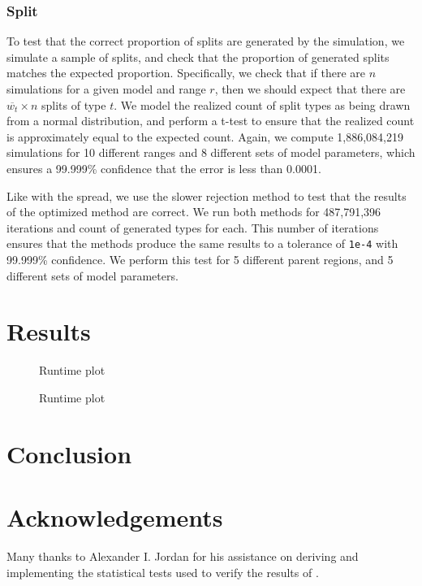 \documentclass{article}
\begin{document}
\subsubsection{Split}

To test that the correct proportion of splits are generated by the simulation,
we simulate a sample of splits, and check that the proportion of generated
splits matches the expected proportion.
Specifically, we check that if there are \(n\) simulations for a given model
and range \( r \), then we should expect that there are \(\overline{w_t} \times
n\) splits of type \( t \).
We model the realized count of split types as being drawn from a normal
distribution, and perform a t-test to ensure that the realized count is
approximately equal to the expected count.
Again, we compute 1,886,084,219 simulations for 10 different ranges and 8
different sets of model parameters, which ensures a 99.999\% confidence that
the error is less than 0.0001.

Like with the spread, we use the slower rejection method to test that the
results of the optimized method are correct.
We run both methods for 487,791,396 iterations and count of generated types for
each.
This number of iterations ensures that the methods produce the same results to
a tolerance of \texttt{1e-4} with 99.999\% confidence.
We perform this test for 5 different parent regions, and 5 different sets of
model parameters.

\section{Results}

\begin{figure}
    \centering
    
    \caption{Runtime plot}\label{fig:runtime-taxa}
\end{figure}

\begin{figure}
    \centering
    
    \caption{Runtime plot}\label{fig:runtime-regions}
\end{figure}

\section{Conclusion}

\section{Acknowledgements}

Many thanks to Alexander I. Jordan for his assistance on deriving and
implementing the statistical tests used to verify the results of \bigrig{}.


\end{document}
